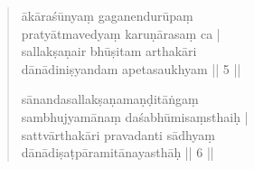 \documentclass[12pt]{article}
\begin{document}
\begin{quote}
	ākāraśūnyaṃ gaganendurūpaṃ \\
	pratyātmavedyaṃ karuṇārasaṃ ca |\\
	sallakṣaṇair bhūṣitam\footnoteB{
		bhūṣitam] \EDD ; bhuṣitam \MS
	} arthakāri \\
	dānādiniṣyandam apetasaukhyam || 5 ||
 
	sānandasallakṣaṇamaṇḍitāṅgaṃ \\
	sambhujyamānaṃ daśabhūmisaṃsthaiḥ |\\
	sattvārthakāri pravadanti sādhyaṃ \\
	dānādiṣaṭpāramitānayasthāḥ || 6 ||

% 
% 
\end{quote}
\end{document}
